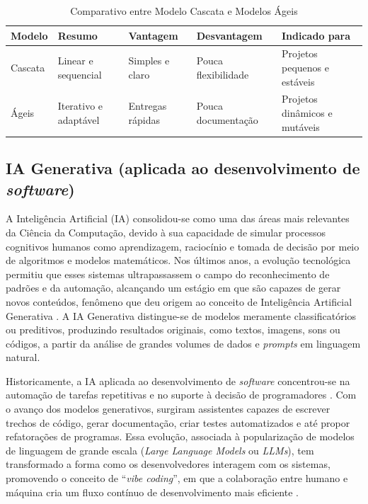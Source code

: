 \documentclass[english,brazilian]{UNISINOSartigo} %
\begin{document}
\begin{table}[ht]
    \caption{Comparativo entre Modelo Cascata e Modelos Ágeis}
    \label{tab:modelosDev}
    \centering%
    \footnotesize
    \begin{tabularx}{\textwidth}{lXXXX}
        \toprule
        \textbf{Modelo} & \textbf{Resumo} & \textbf{Vantagem} & \textbf{Desvantagem} & \textbf{Indicado para}\\
        \midrule
        Cascata & Linear e sequencial & Simples e claro & Pouca flexibilidade & Projetos pequenos e estáveis \\
        \midrule
        Ágeis & Iterativo e adaptável & Entregas rápidas & Pouca documentação & Projetos dinâmicos e mutáveis \\
        \bottomrule
    \end{tabularx}
\end{table}
\FloatBarrier

\subsection{IA Generativa (aplicada ao desenvolvimento de \textit{software})}

A Inteligência Artificial (IA) consolidou-se como uma das áreas mais relevantes da Ciência da Computação, devido à sua capacidade de simular processos cognitivos humanos como aprendizagem, raciocínio e tomada de decisão por meio de algoritmos e modelos matemáticos. Nos últimos anos, a evolução tecnológica permitiu que esses sistemas ultrapassassem o campo do reconhecimento de padrões e da automação, alcançando um estágio em que são capazes de gerar novos conteúdos, fenômeno que deu origem ao conceito de Inteligência Artificial Generativa \cite{basic2024, sauvola2024}. A IA Generativa distingue-se de modelos meramente classificatórios ou preditivos, produzindo resultados originais, como textos, imagens, sons ou códigos, a partir da análise de grandes volumes de dados e \textit{prompts} em linguagem natural.

Historicamente, a IA aplicada ao desenvolvimento de \textit{software} concentrou-se na automação de tarefas repetitivas e no suporte à decisão de programadores \cite{velpucharla2025}. Com o avanço dos modelos generativos, surgiram assistentes capazes de escrever trechos de código, gerar documentação, criar testes automatizados e até propor refatorações de programas. Essa evolução, associada à popularização de modelos de linguagem de grande escala (\textit{Large Language Models} ou \textit{LLMs}), tem transformado a forma como os desenvolvedores interagem com os sistemas, promovendo o conceito de “\textit{vibe coding}”, em que a colaboração entre humano e máquina cria um fluxo contínuo de desenvolvimento mais eficiente \cite{song2025}.
\end{document}

